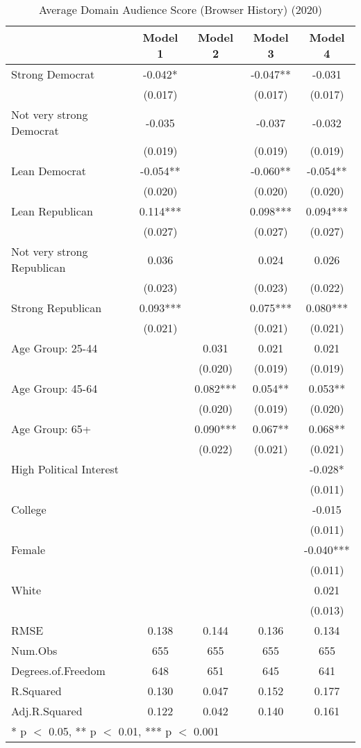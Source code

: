\begin{table}

\caption{Average Domain Audience Score (Browser History) (2020)}
\centering
\begin{tabular}[t]{lcccc}
\toprule
  & Model 1 & Model 2 & Model 3 & Model 4\\
\midrule
Strong Democrat & -0.042* &  & -0.047** & -0.031\\
 & (0.017) &  & (0.017) & (0.017)\\
Not very strong Democrat & -0.035 &  & -0.037 & -0.032\\
 & (0.019) &  & (0.019) & (0.019)\\
Lean Democrat & -0.054** &  & -0.060** & -0.054**\\
 & (0.020) &  & (0.020) & (0.020)\\
Lean Republican & 0.114*** &  & 0.098*** & 0.094***\\
 & (0.027) &  & (0.027) & (0.027)\\
Not very strong Republican & 0.036 &  & 0.024 & 0.026\\
 & (0.023) &  & (0.023) & (0.022)\\
Strong Republican & 0.093*** &  & 0.075*** & 0.080***\\
 & (0.021) &  & (0.021) & (0.021)\\
Age Group: 25-44 &  & 0.031 & 0.021 & 0.021\\
 &  & (0.020) & (0.019) & (0.019)\\
Age Group: 45-64 &  & 0.082*** & 0.054** & 0.053**\\
 &  & (0.020) & (0.019) & (0.020)\\
Age Group: 65+ &  & 0.090*** & 0.067** & 0.068**\\
 &  & (0.022) & (0.021) & (0.021)\\
High Political Interest &  &  &  & -0.028*\\
 &  &  &  & \vphantom{2} (0.011)\\
College &  &  &  & -0.015\\
 &  &  &  & \vphantom{1} (0.011)\\
Female &  &  &  & -0.040***\\
 &  &  &  & (0.011)\\
White &  &  &  & 0.021\\
 &  &  &  & (0.013)\\
\midrule
RMSE & 0.138 & 0.144 & 0.136 & 0.134\\
Num.Obs & 655 & 655 & 655 & 655\\
Degrees.of.Freedom & 648 & 651 & 645 & 641\\
R.Squared & 0.130 & 0.047 & 0.152 & 0.177\\
Adj.R.Squared & 0.122 & 0.042 & 0.140 & 0.161\\
\bottomrule
\multicolumn{5}{l}{\rule{0pt}{1em}* p $<$ 0.05, ** p $<$ 0.01, *** p $<$ 0.001}\\
\end{tabular}
\end{table}

